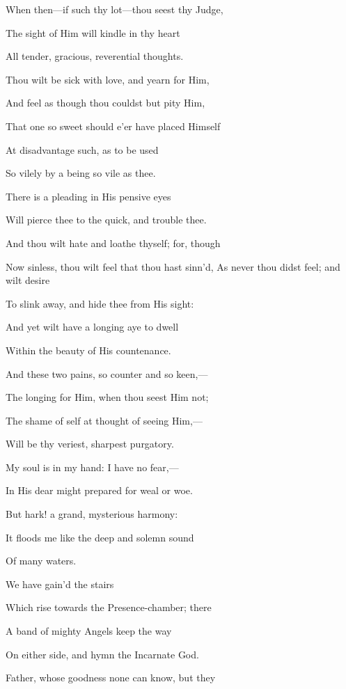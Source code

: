 When then—if such thy lot—thou seest thy Judge,

The sight of Him will kindle in thy heart

All tender, gracious, reverential thoughts.

Thou wilt be sick with love, and yearn for Him,

And feel as though thou couldst but pity Him,

That one so sweet should e'er have placed Himself

At disadvantage such, as to be used

So vilely by a being so vile as thee.

There is a pleading in His pensive eyes

Will pierce thee to the quick, and trouble thee.

And thou wilt hate and loathe thyself; for, though

Now sinless, thou wilt feel that thou hast sinn'd, As never thou didst feel; and wilt desire

To slink away, and hide thee from His sight:

And yet wilt have a longing aye to dwell

Within the beauty of His countenance.

And these two pains, so counter and so keen,—

The longing for Him, when thou seest Him not;

The shame of self at thought of seeing Him,—

Will be thy veriest, sharpest purgatory.


My soul is in my hand: I have no fear,—

In His dear might prepared for weal or woe.

But hark! a grand, mysterious harmony:

It floods me like the deep and solemn sound

Of many waters.


We have gain'd the stairs

Which rise towards the Presence-chamber; there

A band of mighty Angels keep the way

On either side, and hymn the Incarnate God.


Father, whose goodness none can know, but they

